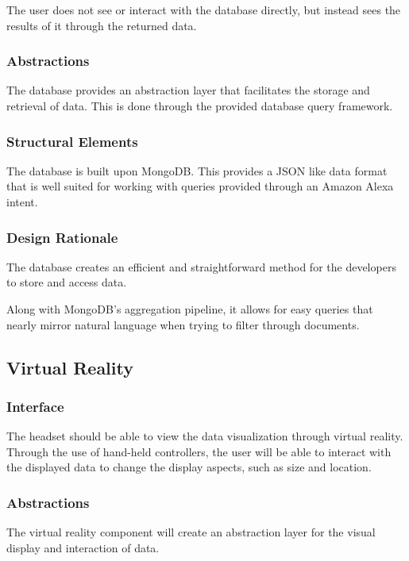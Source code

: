 \documentclass[onecolumn, draftclsnofoot,10pt, compsoc]{IEEEtran}
\begin{document}
            The user does not see or interact with the database directly, but instead sees the results of it through the returned data.
        
        \subsubsection{Abstractions}
            The database provides an abstraction layer that facilitates the storage and retrieval of data. This is done through the provided database query framework.
        
        \subsubsection{Structural Elements}
            The database is built upon MongoDB. This provides a JSON like data format that is well suited for working with queries provided through an Amazon Alexa intent.
        
        \subsubsection{Design Rationale}
            The database creates an efficient and straightforward method for the developers to store and access data. 
            
            Along with MongoDB{'}s aggregation pipeline, it allows for easy queries that nearly mirror natural language when trying to filter through documents. 
        
    \subsection{Virtual Reality}
        \subsubsection{Interface}
            The headset should be able to view the data visualization through virtual reality. Through the use of hand-held controllers, the user will be able to interact with the displayed data to change the display aspects, such as size and location.
        
        \subsubsection{Abstractions}
            The virtual reality component will create an abstraction layer for the visual display and interaction of data.
        
\end{document}
